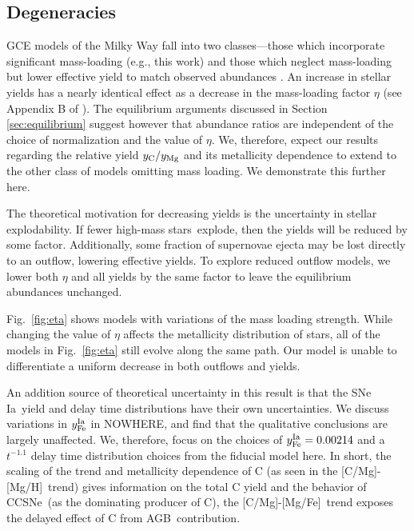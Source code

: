 \documentclass[fleqn,usenatbib]{mnras}
\newcommand{\agb}{AGB}
\newcommand{\cc}{CCSNe}
\newcommand{\gce}{GCE}
\newcommand{\ia}{SNe Ia}
\newcommand{\hms}{high-mass stars}
\newcommand{\caah}{[C/Mg]-[Mg/H]}
\newcommand{\caafe}{[C/Mg]-[Mg/Fe]}
\begin{document}
\subsection{Degeneracies} \label{sec:outflows}


\gce{} models of the Milky Way fall into two classes---those which incorporate significant mass-loading (e.g., this work) and those which neglect mass-loading but lower effective yield to match observed abundances \citep[e.g.][]{MCM13, MCM14, spitoni19, spitoni20, spitoni21}.
An increase in stellar yields has a nearly identical effect as a decrease in the mass-loading factor $\eta$ (see Appendix B of \citealt{james_dwarf}).
The equilibrium arguments discussed in Section \ref{sec:equilibrium} suggest however that abundance ratios are independent of the choice of normalization and the value of $\eta$. We, therefore, expect our results regarding the relative yield $y_{\rm C}/y_{\rm Mg}$ and its metallicity dependence to extend to the other class of models omitting mass loading. We demonstrate this further here.

The theoretical motivation for decreasing yields is the uncertainty in stellar explodability.
If fewer \hms\ explode, then the yields will be reduced by some factor. Additionally, some fraction of supernovae ejecta may be lost directly to an outflow, lowering effective yields. To explore reduced outflow models, we lower both $\eta$ and all yields by the same factor to leave the equilibrium abundances unchanged. 

Fig.~\ref{fig:eta} shows models with variations of the mass loading strength. While changing the value of $\eta$ affects the metallicity distribution of stars, all of the models in Fig.~\ref{fig:eta} still evolve along the same path. Our model is unable to differentiate a uniform decrease in both outflows and yields.

An addition source of theoretical uncertainty in this result is that the \ia\ yield and delay time distributions have their own uncertainties. We discuss variations in $y_{\rm Fe}^{\rm Ia}$ in NOWHERE, and find that the qualitative conclusions are largely unaffected. We, therefore, focus on the choices of $y_{\rm Fe}^{\rm Ia} = 0.00214$ and a $t^{-1.1}$ delay time distribution choices from the fiducial model here.
In short, the scaling of the trend and metallicity dependence of C (as seen in
the \caah\ trend) gives information on the total C yield and the behavior of \cc\ (as the dominating producer of C), the \caafe\ trend exposes the delayed effect of C from \agb\ contribution.
\end{document}

